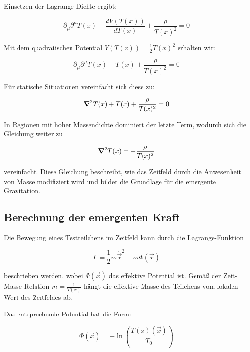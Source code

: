 \documentclass[12pt,a4paper]{article}
\newcommand{\Tfield}{T(x)}
\newcommand{\Tzero}{T_0}
\newcommand{\vecx}{\vec{x}}
\begin{document}
	Einsetzen der Lagrange-Dichte ergibt:
	
	\begin{equation}
		\partial_\mu \partial^\mu \Tfield + \frac{dV(\Tfield)}{d\Tfield} + \frac{\rho}{\Tfield^2} = 0
	\end{equation}
	
	Mit dem quadratischen Potential \(V(\Tfield) = \frac{1}{2} \Tfield^2\) erhalten wir:
	
	\begin{equation}
		\partial_\mu \partial^\mu \Tfield + \Tfield + \frac{\rho}{\Tfield^2} = 0
	\end{equation}
	
	Für statische Situationen vereinfacht sich diese zu:
	
	\begin{equation}
		\grad^2 \Tfield + \Tfield + \frac{\rho}{\Tfield^2} = 0
	\end{equation}
	
	In Regionen mit hoher Massendichte dominiert der letzte Term, wodurch sich die Gleichung weiter zu
	
	\begin{equation}
		\grad^2 \Tfield = -\frac{\rho}{\Tfield^2}
	\end{equation}
	
	vereinfacht. Diese Gleichung beschreibt, wie das Zeitfeld durch die Anwesenheit von Masse modifiziert wird und bildet die Grundlage für die emergente Gravitation.
	
	\subsection{Berechnung der emergenten Kraft}
	
	Die Bewegung eines Testteilchens im Zeitfeld kann durch die Lagrange-Funktion
	
	\begin{equation}
		L = \frac{1}{2}m\dot{\vecx}^2 - m\Phi(\vecx)
	\end{equation}
	
	beschrieben werden, wobei \(\Phi(\vecx)\) das effektive Potential ist. Gemäß der Zeit-Masse-Relation \(m = \frac{1}{\Tfield}\) hängt die effektive Masse des Teilchens vom lokalen Wert des Zeitfeldes ab.
	
	Das entsprechende Potential hat die Form:
	
	\begin{equation}
		\Phi(\vecx) = -\ln\left(\frac{\Tfield(\vecx)}{\Tzero}\right)
	\end{equation}
	
\end{document}
